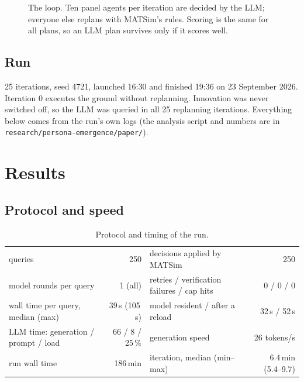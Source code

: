 \documentclass[10pt,a4paper]{article}
\begin{document}
\begin{figure}[t]
\caption{The loop. Ten panel agents per iteration are decided by the LLM; everyone else replans with MATSim's rules. Scoring is the same for all plans, so an LLM plan survives only if it scores well.}
\label{fig:scheme}
\end{figure}

\subsection{Run}
25 iterations, seed 4721, launched 16:30 and finished 19:36 on 23 September 2026. Iteration 0 executes the ground without replanning. Innovation was never switched off, so the LLM was queried in all 25 replanning iterations. Everything below comes from the run's own logs (the analysis script and numbers are in \texttt{research/persona-emergence/paper/}).

\section{Results}
\subsection{Protocol and speed}
\begin{table}[h]\centering\small
\begin{tabular}{lrlr}\toprule
queries & 250 & decisions applied by MATSim & 250 \\
model rounds per query & 1 (all) & retries / verification failures / cap hits & 0 / 0 / 0 \\
wall time per query, median (max) & 39\,s (105\,s) & model resident / after a reload & 32\,s / 52\,s \\
LLM time: generation / prompt / load & 66 / 8 / 25\,\% & generation speed & 26 tokens/s \\
run wall time & 186\,min & iteration, median (min--max) & 6.4\,min (5.4--9.7) \\
\bottomrule\end{tabular}
\caption{Protocol and timing of the run.}\label{tab:protocol}\end{table}
\end{document}
